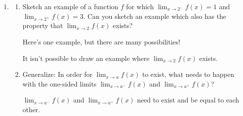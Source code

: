 \documentclass{article}
\begin{document}
\begin{enumerate}[resume]
\item 

  \begin{enumerate}
  \item

    \begin{problem}[\vfill]
      Sketch an example of a function $f$ for which $\displaystyle \lim_{x \to 2^-} f(x) = 1$ and $\displaystyle \lim_{x \to 2^+} f(x) = 3$. Can you sketch an example which also has the property that $\displaystyle \lim_{x \to 2} f(x)$ exists?
    \end{problem}

    \begin{solution}
      Here's one example, but there are many possibilities!
      \begin{center}
      \end{center}
      It isn't possible to draw an example where $\displaystyle \lim_{x \to 2} f(x)$ exists.
    \end{solution}

  \item


    \begin{problem}[\vfill\newpage]
      Generalize: In order for $\displaystyle \lim_{x \to a} f(x)$ to exist, what needs to happen with the one-sided limits $\displaystyle \lim_{x \to a^-} f(x)$ and $\displaystyle \lim_{x \to a^+} f(x)$?
    \end{problem}

    \begin{solution}
      $\displaystyle \lim_{x \to a^-} f(x)$ and $\displaystyle \lim_{x \to a^+} f(x)$ need to exist and be equal to each other.
    \end{solution}

  \end{enumerate}



\end{enumerate}
\end{document}
